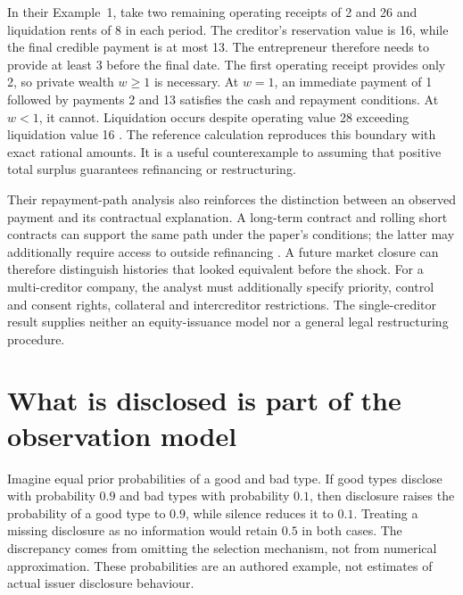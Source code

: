 \documentclass[11pt,a4paper]{article}
\begin{document}
In their Example~1, take two remaining operating receipts of 2 and 26 and
liquidation rents of 8 in each period. The creditor's reservation value is
16, while the final credible payment is at most 13. The entrepreneur therefore
needs to provide at least 3 before the final date. The first operating receipt
provides only 2, so private wealth $w\ge1$ is necessary. At $w=1$, an immediate
payment of 1 followed by payments 2 and 13 satisfies the cash and repayment
conditions. At $w<1$, it cannot. Liquidation occurs despite operating value
28 exceeding liquidation value 16 \cite[Example~1, printed p.~16]{hartmoore}.
The reference calculation reproduces this boundary with exact rational amounts.
It is a useful counterexample to assuming that positive total surplus guarantees
refinancing or restructuring.

Their repayment-path analysis also reinforces the distinction between an
observed payment and its contractual explanation. A long-term contract and
rolling short contracts can support the same path under the paper's conditions;
the latter may additionally require access to outside refinancing
\cite[Proposition~2 and printed pp.~27--28]{hartmoore}. A future market closure
can therefore distinguish histories that looked equivalent before the shock.
For a multi-creditor company, the analyst must additionally specify priority,
control and consent rights, collateral and intercreditor restrictions. The
single-creditor result supplies neither an equity-issuance model nor a general
legal restructuring procedure.

\section{What is disclosed is part of the observation model}
Imagine equal prior probabilities of a good and bad type. If good types
disclose with probability $0.9$ and bad types with probability $0.1$, then
disclosure raises the probability of a good type to $0.9$, while silence
reduces it to $0.1$. Treating a missing disclosure as no information would
retain $0.5$ in both cases. The discrepancy comes from omitting the selection
mechanism, not from numerical approximation. These probabilities are an
authored example, not estimates of actual issuer disclosure behaviour.
\end{document}
